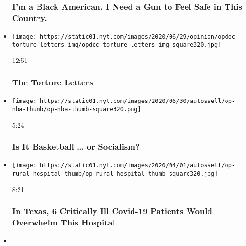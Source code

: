 \begin{itemize}
  \hypertarget{im-a-black-american-i-need-a-gun-to-feel-safe-in-this-country}{%
  \subsubsection{I'm a Black American. I Need a Gun to Feel Safe in This
  Country.}\label{im-a-black-american-i-need-a-gun-to-feel-safe-in-this-country}}
\item
  \href{https://www.nytimes.com/video/opinion/100000007205588/the-torture-letters.html?action=click\&module=video-series-bar\&region=header\&pgtype=Article\&playlistId=video/opinion}{}

  \texttt{[image: https://static01.nyt.com/images/2020/06/29/opinion/opdoc-torture-letters-img/opdoc-torture-letters-img-square320.jpg]}

  12:51

  \hypertarget{the-torture-letters}{%
  \subsubsection{The Torture Letters}\label{the-torture-letters}}
\item
  \href{https://www.nytimes.com/video/opinion/100000007182805/income-inequality-nba-socialism.html?action=click\&module=video-series-bar\&region=header\&pgtype=Article\&playlistId=video/opinion}{}

  \texttt{[image: https://static01.nyt.com/images/2020/06/30/autossell/op-nba-thumb/op-nba-thumb-square320.png]}

  5:24

  \hypertarget{is-it-basketball--or-socialism}{%
  \subsubsection{Is It Basketball \ldots{} or
  Socialism?}\label{is-it-basketball--or-socialism}}
\item
  \href{https://www.nytimes.com/video/opinion/100000007105817/coronavirus-texas-hospital.html?action=click\&module=video-series-bar\&region=header\&pgtype=Article\&playlistId=video/opinion}{}

  \texttt{[image: https://static01.nyt.com/images/2020/04/01/autossell/op-rural-hospital-thumb/op-rural-hospital-thumb-square320.jpg]}

  8:21

  \hypertarget{in-texas-6-critically-ill-covid-19-patients-would-overwhelm-this-hospital}{%
  \subsubsection{In Texas, 6 Critically Ill Covid-19 Patients Would
  Overwhelm This
  Hospital}\label{in-texas-6-critically-ill-covid-19-patients-would-overwhelm-this-hospital}}
\item
  \href{https://www.nytimes.com/video/opinion/100000007172575/forgiveness-day.html?action=click\&module=video-series-bar\&region=header\&pgtype=Article\&playlistId=video/opinion}{}


\end{itemize}
